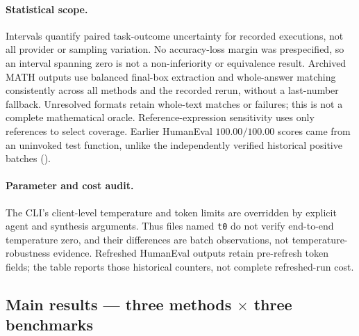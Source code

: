 \documentclass[11pt,twoside,twocolumn,letterpaper]{article}
\begin{document}
\paragraph{Statistical scope.} Intervals quantify paired task-outcome uncertainty for recorded executions, not all provider or sampling variation. No accuracy-loss margin was prespecified, so an interval spanning zero is not a non-inferiority or equivalence result. Archived MATH outputs use balanced final-box extraction and whole-answer matching consistently across all methods and the recorded rerun, without a last-number fallback. Unresolved formats retain whole-text matches or failures; this is not a complete mathematical oracle. Reference-expression sensitivity uses only references to select coverage. Earlier HumanEval $100.00/100.00$ scores came from an uninvoked test function, unlike the independently verified historical positive batches ().

\paragraph{Parameter and cost audit.} The CLI's client-level temperature and token limits are overridden by explicit agent and synthesis arguments. Thus files named \texttt{t0} do not verify end-to-end temperature zero, and their differences are batch observations, not temperature-robustness evidence. Refreshed HumanEval outputs retain pre-refresh token fields; the table reports those historical counters, not complete refreshed-run cost.

\subsection{Main results --- three methods $\times$ three benchmarks}


\end{document}
